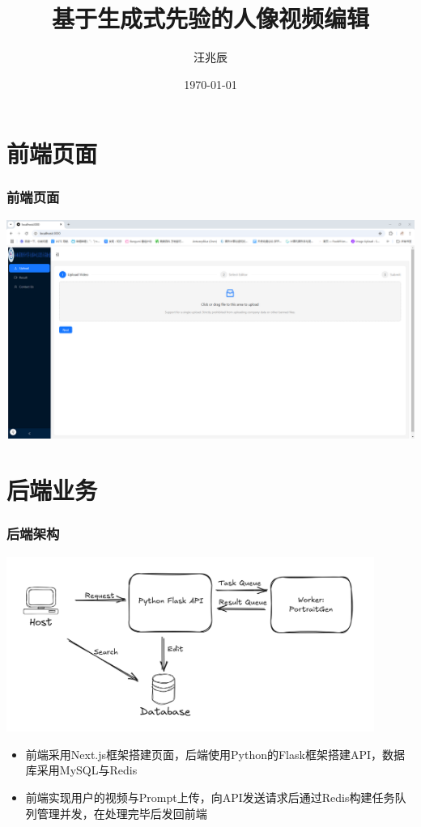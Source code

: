\documentclass{beamer}
\title{基于生成式先验的人像视频编辑}
\author{汪兆辰}
\date{\ukdate\today}
\begin{document}
\begin{frame}
    \titlepage
\end{frame}

\section{前端页面}

\begin{frame}
    \frametitle{前端页面}
    \includegraphics[width=\textwidth]{pic2.png}
\end{frame}


\section{后端业务}

\begin{frame}
    \frametitle{后端架构}
    \includegraphics[width=0.9\textwidth]{pic1.png}
    \begin{itemize}
        \item 前端采用Next.js框架搭建页面，后端使用Python的Flask框架搭建API，数据库采用MySQL与Redis
        \item 前端实现用户的视频与Prompt上传，向API发送请求后通过Redis构建任务队列管理并发，在处理完毕后发回前端
    \end{itemize}

\end{frame}
\end{document}
